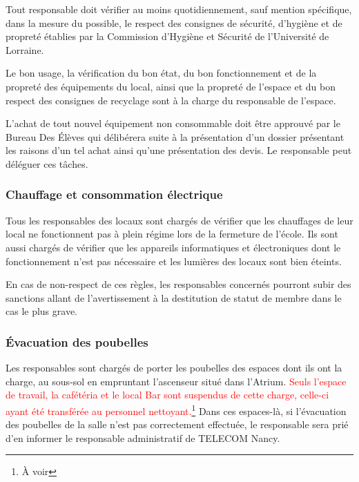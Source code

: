 \documentclass{article} %
\begin{document}
				Tout responsable doit vérifier au moins quotidiennement, sauf
				mention spécifique, dans la mesure du possible, le respect des
				consignes de sécurité, d’hygiène et de propreté établies par la
				Commission d’Hygiène et Sécurité de l’Université de Lorraine.

				Le bon usage, la vérification du bon état, du bon
				fonctionnement et de la propreté des équipements du local, ainsi
				que la propreté de l’espace et du bon respect des consignes de
				recyclage sont à la charge du responsable de l’espace.

				L’achat de tout nouvel équipement non consommable doit être
				approuvé par le Bureau Des Élèves qui délibérera suite à la
				présentation d’un dossier présentant les raisons d’un tel achat
				ainsi qu’une présentation des devis. Le responsable peut
				déléguer ces tâches.

			\subsubsection{Chauffage et consommation électrique}

				Tous les responsables des locaux sont chargés de vérifier que
				les chauffages de leur local ne fonctionnent pas à plein régime
				lors de la fermeture de l’école. Ils sont aussi chargés de
				vérifier que les appareils informatiques et électroniques dont
				le fonctionnement n’est pas nécessaire et les lumières des
				locaux sont bien éteints.

				En cas de non-respect de ces règles, les responsables concernés
				pourront subir des sanctions allant de l’avertissement à la
				destitution de statut de membre dans le cas le plus grave.

			\subsubsection{Évacuation des poubelles}

				Les responsables sont chargés de porter les poubelles des
				espaces dont ils ont la charge, au sous-sol en empruntant
				l’ascenseur situé dans l’Atrium.
				\textcolor{red}{Seuls l’espace de travail, la cafétéria et le
				local Bar sont suspendus de cette charge, celle-ci ayant été
				transférée au personnel nettoyant.}\footnote{À voir} Dans ces
				espaces-là, si l’évacuation des poubelles de la salle n’est pas
				correctement effectuée, le responsable sera prié d’en informer
				le responsable administratif de TELECOM Nancy.
\end{document}
